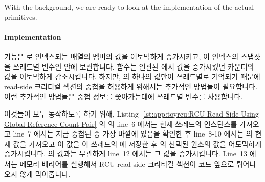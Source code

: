With the background, we are ready to look at the implementation of the
actual primitives.
\fi

\paragraph{Implementation}

 기능은  로 인덱스되는  배열의
멤버의 값을 어토믹하게 증가시키고, 이 인덱스의 스냅샷을 쓰레드별 변수인
 안에 보관합니다.
 함수는 연관된  에서 값을 증가시켰던
카운터의 값을 어토믹하게 감소시킵니다.
하지만,  의 하나의 값만이 쓰레드별로 기억되기 때문에 read-side
크리티컬 섹션의 중첩을 허용하게 위해서는 추가적인 방법들이 필요합니다.
이런 추가적인 방법들은 중첩 정보를 쫓아가는데에 쓰레드별 
변수를 사용합니다.
\iffalse

The \co{rcu_read_lock()} primitive atomically increments the member of the
\co{rcu_refcnt[]} pair indexed by \co{rcu_idx}, and keeps a
snapshot of this index in the per-thread variable \co{rcu_read_idx}.
The \co{rcu_read_unlock()} primitive then atomically decrements
whichever counter of the pair that the corresponding \co{rcu_read_lock()}
incremented.
However, because only one value of \co{rcu_idx} is remembered per thread,
additional measures must be taken to permit nesting.
These additional measures use the per-thread \co{rcu_nesting} variable
to track nesting.
\fi

이것들이 모두 동작하도록 하기 위해,
Listing~\ref{lst:app:toyrcu:RCU Read-Side Using Global Reference-Count Pair}
의  의 line~6 에서는 현재 쓰레드의 
인스턴스를 가져오고 line~7 에서는 지금 중첩된  중 가장
바깥에 있음을 확인한 후 line~8-10 에서는  의 현재 값을 가져오고 이
값을 이 쓰레드의  에 저장한 후  의 선택된
원소의 값을 어토믹하게 증가시킵니다.
 의 값과는 무관하게 line~12 에서는 그 값을 증가시킵니다.
Line~13 에서는 메모리 배리어를 실행해서 RCU read-side 크리티컬 섹션이
 코드 앞으로 튀어나오지 않게 막아줍니다.
\iffalse

To make all this work, line~6 of \co{rcu_read_lock()} in
Listing~\ref{lst:app:toyrcu:RCU Read-Side Using Global Reference-Count Pair}
picks up the
current thread's instance of \co{rcu_nesting}, and if line~7 finds
that this is the outermost \co{rcu_read_lock()},
then lines~8-10 pick up the current value of
\co{rcu_idx}, save it in this thread's instance of \co{rcu_read_idx},
and atomically increment the selected element of \co{rcu_refcnt}.
Regardless of the value of \co{rcu_nesting}, line~12 increments it.
Line~13 executes a memory barrier to ensure that the RCU read-side
critical section does not bleed out before the \co{rcu_read_lock()} code.
\fi

